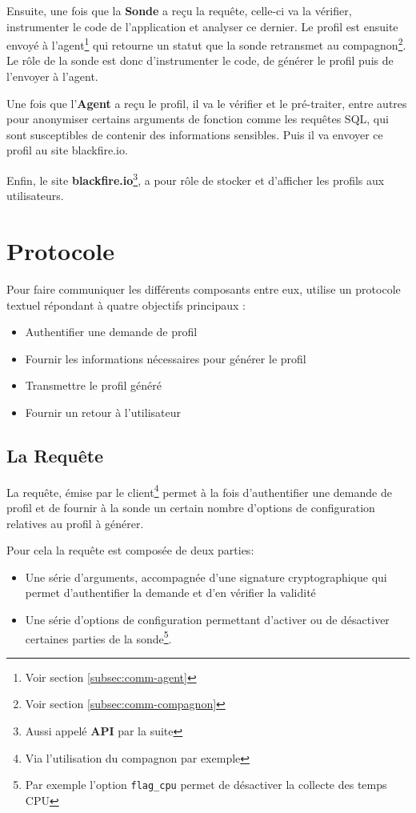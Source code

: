 Ensuite, une fois que la \textbf{Sonde} a reçu la requête, celle-ci va la vérifier, instrumenter le code de l'application et analyser ce dernier. Le profil est ensuite envoyé à l'agent\footnote{Voir section \vref{subsec:comm-agent}} qui retourne un statut que la sonde retransmet au compagnon\footnote{Voir section \vref{subsec:comm-compagnon}}. Le rôle de la sonde est donc d'instrumenter le code, de générer le profil puis de l'envoyer à l'agent.

Une fois que l'\textbf{Agent} a reçu le profil, il va le vérifier et le pré-traiter, entre autres pour anonymiser certains arguments de fonction comme les requêtes SQL, qui sont susceptibles de contenir des informations sensibles. Puis il va envoyer ce profil au site blackfire.io.

Enfin, le site \textbf{blackfire.io}\footnote{Aussi appelé \textbf{API} par la suite}, a pour rôle de stocker et d'afficher les profils aux utilisateurs.

		\section{Protocole}
			\label{sec:BlackfireProtocol}
Pour faire communiquer les différents composants entre eux, \Blackfire utilise un protocole textuel répondant à quatre objectifs principaux :
\begin{itemize}
\item Authentifier une demande de profil
\item Fournir les informations nécessaires pour générer le profil
\item Transmettre le profil généré
\item Fournir un retour à l'utilisateur
\end{itemize}

			\subsection{La Requête}
			\label{subsec:BlackfireQuery}
La requête, émise par le client\footnote{Via l'utilisation du compagnon par exemple} permet à la fois d'authentifier une demande de profil et de fournir à la sonde un certain nombre d'options de configuration relatives au profil à générer.

Pour cela la requête est composée de deux parties:
\begin{itemize}
\item Une série d'arguments, accompagnée d'une signature cryptographique qui permet d'authentifier la demande et d'en vérifier la validité
\item Une série d'options de configuration permettant d'activer ou de désactiver certaines parties de la sonde\footnote{Par exemple l'option \verb|flag_cpu| permet de désactiver la collecte des temps CPU}.
\end{itemize}

